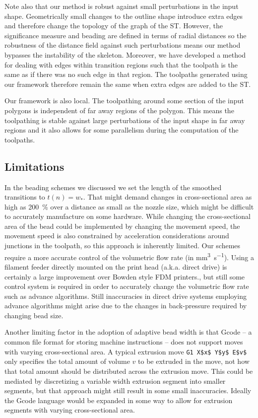 Note also that our method is robust against small perturbations in the input shape.
Geometrically small changes to the outline shape introduce extra edges and therefore change the topology of the graph of the ST.
However, the significance measure and beading are defined in terms of radial distances so the robustness of the distance field against such perturbations means our method bypasses the instability of the skeleton.
Moreover, we have developed a method for dealing with edges within transition regions such that the toolpath is the same as if there was no such edge in that region.
The toolpaths generated using our framework therefore remain the same when extra edges are added to the ST.

Our framework is also local.
The toolpathing around some section of the input polygons is independent of far away regions of the polygon.
This means the toolpathing is stable against large perturbations of the input shape in far away regions
and it also allows for some parallelism during the computation of the toolpaths.



\subsection{Limitations}
In the beading schemes we discussed we set the length of the smoothed transitions to $t(n) = w_*$.
That might demand changes in cross-sectional area as high as \SI{200}{\percent} over a distance as small as the nozzle size,
which might be difficult to accurately manufacture on some hardware.
While changing the cross-sectional area of the bead could be implemented by changing the movement speed, the movement speed is also constrained by acceleration considerations around junctions in the toolpath, so this approach is inherently limited.
Our schemes require a more accurate control of the volumetric flow rate (in \si{\milli\meter\cubed\per\second}).
Using a filament feeder directly mounted on the print head (a.k.a. direct drive) is certainly a large improvement over Bowden style FDM printers.,
but still some control system is required in order to accurately change the volumetric flow rate such as advance algorithms. \cite{tronvoll2019investigating}
Still inaccuracies in direct drive systems employing advance algorithms might arise due to the changes in back-pressure required by changing bead size.


Another limiting factor in the adoption of adaptive bead width is that Gcode -- a common file format for storing machine instructions -- does not support  moves with varying cross-sectional area.
A typical extrusion move \lstinline{G1 X$x$ Y$y$ E$v$} only specifies the total amount of volume $v$ to be extruded in the move, not how that total amount should be distributed across the extrusion move.
This could be mediated by discretizing a variable width extrusion segment into smaller segments, but that approach might still result in some small inaccuracies.
Ideally the Gcode language would be expanded in some way to allow for extrusion segments with varying cross-sectional area.


